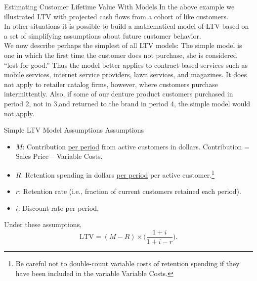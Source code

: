 \documentclass[pdf]{beamer}
\theoremstyle{remark}
\theoremstyle{definition}
\begin{document}
\begin{frame}[t]{Estimating Customer Lifetime Value With Models}
In the above example we illustrated LTV with projected cash flows from a cohort of like customers. \\
\vspace{1.5ex}
In other situations it is possible to build a mathematical model of LTV based on a set of simplifying assumptions about future customer behavior. \\
\vspace{1.5ex}
We now describe perhaps the simplest of all LTV models: The simple model is one in which the first time the customer does not purchase, she is considered ``lost for good.'' Thus the model better applies to contract-based services such as mobile services, internet service providers, lawn services, and magazines. It does not apply to retailer catalog firms, however, where customers purchase intermittently. Also, if some of our denture product customers purchased in period 2, not in 3,and returned to the brand in period 4, the simple model would not apply.
\end{frame}

\begin{frame}[t]{Simple LTV Model Assumptions}
Assumptions \\
\vspace{1.5ex}
\begin{itemize}
\item $M$:  Contribution \underline{per period} from active customers in dollars. Contribution = Sales Price – Variable Costs.
\item $R$:  Retention spending in dollars \underline{per period} per active customer.\footnote{Be careful not to double-count variable costs of retention spending if they have been included in the variable Variable Costs.}
\item $r$:  Retention rate (i.e., fraction of current customers retained each period).
\item $i$:  Discount rate per period.
\end{itemize}
Under these assumptions, 
\begin{equation} \label{eqn:eqn1}
\text{LTV} = (M - R) \times \bigg( \frac{1+i}{1+i-r} \bigg).
\end{equation}

\end{frame}
\end{document}
